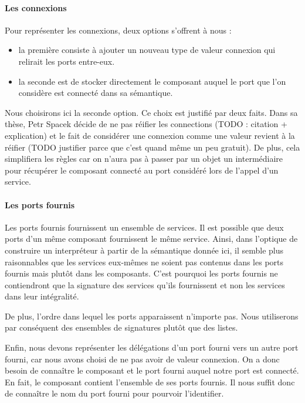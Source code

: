 \documentclass[11pt,a4paper,fleqn]{report}
\begin{document}
\paragraph{Les connexions} Pour représenter les connexions, deux options s'offrent à nous : 
\begin{itemize}
\item la première consiste à ajouter un nouveau type de valeur \textsf{connexion} qui relirait les ports entre-eux. 
\item la seconde est de stocker directement le composant auquel le port que l'on considère est connecté dans sa sémantique.
\end{itemize}

Nous choisirons ici la seconde option. Ce choix est justifié par deux faits. Dans sa thèse, Petr Spacek décide de ne pas réifier les connections (TODO : citation + explication) et le fait de considérer une connexion comme une valeur revient à la réifier (TODO justifier parce que c'est quand même un peu gratuit). De plus, cela simplifiera les règles car on n'aura pas à passer par un objet un intermédiaire pour récupérer le composant connecté au port considéré lors de l'appel d'un service.

\paragraph{Les ports fournis} Les ports fournis fournissent un ensemble de services. Il est possible que deux ports d'un même composant fournissent le même service. Ainsi, dans l'optique de construire un interpréteur à partir de la sémantique donnée ici, il semble plus raisonnables que les services eux-mêmes ne soient pas contenus dans les ports fournis mais plutôt dans les composants. C'est pourquoi les ports fournis ne contiendront que la signature des services qu'ils fournissent et non les services dans leur intégralité.

De plus, l'ordre dans lequel les ports apparaissent n'importe pas. Nous utiliserons par conséquent des ensembles de signatures plutôt que des listes.

Enfin, nous devons représenter les délégations d'un port fourni vers un autre port fourni, car nous avons choisi de ne pas avoir de valeur \textsf{connexion}. On a donc besoin de connaître le composant et le port fourni auquel notre port est connecté. En fait, le composant contient l'ensemble de ses ports fournis. Il nous suffit donc de connaître le nom du port fourni pour pourvoir l'identifier.
\end{document}

